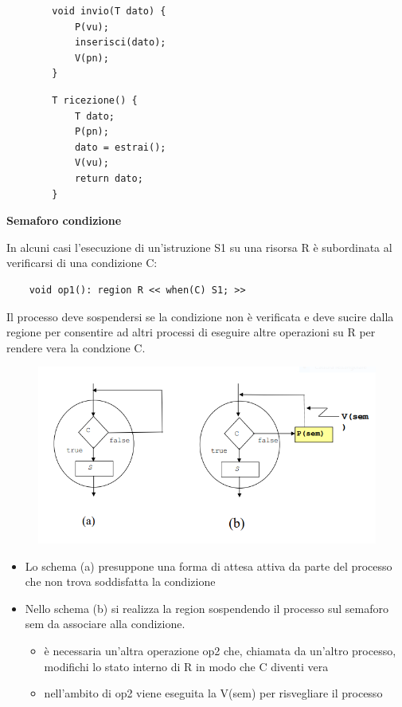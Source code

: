 \documentclass{article}
\begin{document}
\noindent\begin{minipage}{.45\columnwidth}
    \begin{lstlisting}
        void invio(T dato) {
            P(vu);
            inserisci(dato);
            V(pn);
        }
    \end{lstlisting}
\end{minipage}\hfill
\begin{minipage}{.45\columnwidth}
    \begin{lstlisting}
        T ricezione() {
            T dato;
            P(pn);
            dato = estrai();
            V(vu);
            return dato;
        }
    \end{lstlisting}
\end{minipage}

\vspace{5mm}
\textbf{Semaforo condizione}

\vspace{3mm}
In alcuni casi l'esecuzione di un'istruzione S1 su una risorsa R è subordinata al verificarsi di una condizione C:

\begin{lstlisting}
    void op1(): region R << when(C) S1; >>
\end{lstlisting}

\vspace{3mm}
Il processo deve sospendersi se la condizione non è verificata e deve sucire dalla regione per consentire ad altri processi di eseguire altre operazioni su R
per rendere vera la condzione C.

\begin{figure}[htbp]
    \centering
    \includegraphics[width=0.70\columnwidth]{imgs/schema_condizione.PNG}
\end{figure}

\begin{itemize}
    \item Lo schema (a) presuppone una forma di attesa attiva da parte del processo che non trova soddisfatta la condizione
    \item Nello schema (b) si realizza la region sospendendo il processo sul semaforo sem da associare alla condizione.
    \begin{itemize}
        \item è necessaria un'altra operazione op2 che, chiamata da un'altro processo, modifichi lo stato interno di R in modo che C diventi vera
        \item nell'ambito di op2 viene eseguita la V(sem) per risvegliare il processo
    \end{itemize}
\end{itemize}
\end{document}
